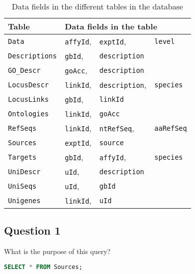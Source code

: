 \begin{table}[H]
	\centering
	\begin{tabular}{l l l l}
		\toprule
		\toprule
		Table                 & \multicolumn{3}{l}{Data fields in the table}    \\
		\midrule
		\texttt{Data}         & \texttt{affyId}, & \texttt{exptId},      & \texttt{level}    \\
		\texttt{Descriptions} & \texttt{gbId},   & \texttt{description}  &                   \\
		\texttt{GO\_Descr}    & \texttt{goAcc},  & \texttt{description}  &                   \\
		\texttt{LocusDescr}   & \texttt{linkId}, & \texttt{description}, & \texttt{species}  \\
		\texttt{LocusLinks}   & \texttt{gbId},   & \texttt{linkId}       &                   \\
		\texttt{Ontologies}   & \texttt{linkId}, & \texttt{goAcc}        &                   \\
		\texttt{RefSeqs}      & \texttt{linkId}, & \texttt{ntRefSeq},    & \texttt{aaRefSeq} \\
		\texttt{Sources}      & \texttt{exptId}, & \texttt{source}       &                   \\
		\texttt{Targets}      & \texttt{gbId},   & \texttt{affyId},      & \texttt{species}  \\
		\texttt{UniDescr}     & \texttt{uId},    & \texttt{description}  &                   \\
		\texttt{UniSeqs}      & \texttt{uId},    & \texttt{gbId}         &                   \\
		\texttt{Unigenes}     & \texttt{linkId}, & \texttt{uId}          &                   \\
		\bottomrule
	\end{tabular}
	\caption{Data fields in the different tables in the  database}
	\label{tab:tablename}
\end{table}

\newpage
\subsection*{Question 1}
What is the purpose of this query?

\begin{lstlisting}[language=sql]
SELECT * FROM Sources;
\end{lstlisting}

